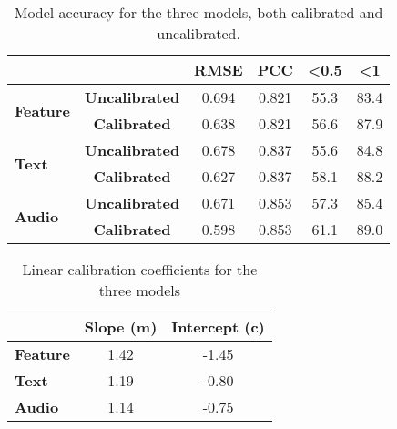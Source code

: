 \begin{table}[H]
    \centering
    \begin{tabular}{|l|c|c|c|c|c|}
        \hline
        \multicolumn{2}{|l|}{}                                  & \textbf{RMSE}         & \textbf{PCC} & \textbf{\textless 0.5} & \textbf{\textless 1}        \\ \hline
        \multicolumn{1}{|l|}{\multirow{2}{*}{\textbf{Feature}}} & \textbf{Uncalibrated} & 0.694        & 0.821                  & 55.3                 & 83.4 \\ \cline{2-6}
        \multicolumn{1}{|l|}{}                                  & \textbf{Calibrated}   & 0.638        & 0.821                  & 56.6                 & 87.9 \\ \hline
        \multicolumn{1}{|l|}{\multirow{2}{*}{\textbf{Text}}}    & \textbf{Uncalibrated} & 0.678        & 0.837                  & 55.6                 & 84.8 \\ \cline{2-6}
        \multicolumn{1}{|l|}{}                                  & \textbf{Calibrated}   & 0.627        & 0.837                  & 58.1                 & 88.2 \\ \hline
        \multicolumn{1}{|l|}{\multirow{2}{*}{\textbf{Audio}}}   & \textbf{Uncalibrated} & 0.671        & 0.853                  & 57.3                 & 85.4 \\ \cline{2-6}
        \multicolumn{1}{|l|}{}                                  & \textbf{Calibrated}   & 0.598        & 0.853                  & 61.1                 & 89.0 \\ \hline
    \end{tabular}
    \caption{Model accuracy for the three models, both calibrated and uncalibrated.}
    \label{tab:model_accuracy}
\end{table}

\begin{table}[H]
    \centering
    \begin{tabular}{|l|c|c|}
        \hline
        \textbf{}        & \textbf{Slope (m)} & \textbf{Intercept (c)} \\ \hline
        \textbf{Feature} & 1.42               & -1.45                  \\ \hline
        \textbf{Text}    & 1.19               & -0.80                  \\ \hline
        \textbf{Audio}   & 1.14               & -0.75                  \\ \hline
    \end{tabular}
    \caption{Linear calibration coefficients for the three models}
    \label{tab:linear_regression_coefficients}
\end{table}

